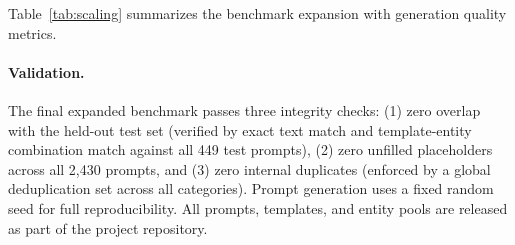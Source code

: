 Table~\ref{tab:scaling} summarizes the benchmark expansion with generation quality metrics.

\begin{table}[ht]
\centering
{}
\caption{Benchmark expansion from held-out test set (449 prompts) to training set (2,430 prompts). Template Coverage = percentage of available templates used at least once. Entity Coverage = percentage of available entities used at least once. Excluded = number of candidate prompts excluded due to overlap with the test set (two-level exclusion). Edge factual prompts are individually curated rather than template-generated. Borderline template coverage is not reported separately because borderline prompts use a different generation pipeline with per-subtype templates.}
\label{tab:scaling}
\end{table}

\paragraph{Validation.} The final expanded benchmark passes three integrity checks: (1) zero overlap with the held-out test set (verified by exact text match and template-entity combination match against all 449 test prompts), (2) zero unfilled placeholders across all 2,430 prompts, and (3) zero internal duplicates (enforced by a global deduplication set across all categories). Prompt generation uses a fixed random seed for full reproducibility. All prompts, templates, and entity pools are released as part of the project repository.

